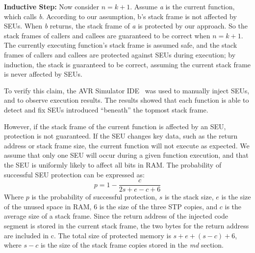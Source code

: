 \textbf{Inductive Step:} Now consider $n=k+1$. Assume \textit{a} is the current function, which calls \textit{b}. According to our assumption, b's stack frame is not affected by SEUs. When \textit{b} returns, the stack frame of \textit{a} is protected by our approach. So the stack frames of callers and callees are guaranteed to be correct when $n=k+1$. The currently executing function's stack frame is assumed safe, and the stack frames of callers and callees are protected against SEUs during execution; by induction, the stack is guaranteed to be correct, assuming the current stack frame is never affected by SEUs.

To verify this claim, the AVR Simulator IDE~\cite{avrsimide} was used to manually inject SEUs, and to observe execution results. The results showed that each function is able to detect and fix SEUs introduced ``beneath'' the topmost stack frame.

However, if the stack frame of the current function is affected by an SEU, protection is not guaranteed. If the SEU changes key data, such as the return address or stack frame size, the current function will not execute as expected. We assume that only one SEU will occur during a given function execution, and that the SEU is uniformly likely to affect all bits in RAM. The probability of successful SEU protection can be expressed as:
\begin{equation}\label{eq_seu1}
p=1-\frac{c}{2s+e-c+6}
\end{equation}
Where $p$ is the probability of successful protection, $s$ is the stack size, $e$ is the size of the unused space in RAM, $6$ is the size of the three STP copies, and $c$ is the average size of a stack frame. Since the return address of the injected code segment is stored in the current stack frame, the two bytes for the return address are included in c. The total size of protected memory is $s+e+(s-c)+6$, where $s-c$ is the size of the stack frame copies stored in the \textit{md} section.

